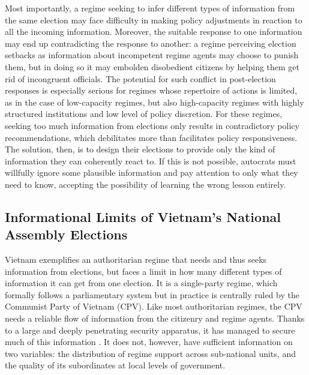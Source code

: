 \documentclass[12pt]{article}
\newcommand{\1}{\mathbbm{1}}
\begin{document}
Most importantly, a regime seeking to infer different types of information from the same election may face difficulty in making policy adjustments in reaction to all the incoming information. Moreover, the suitable response to one information may end up contradicting the response to another: a regime perceiving election setbacks as information about incompetent regime agents may choose to punish them, but in doing so it may embolden disobedient citizens by helping them get rid of incongruent officials. The potential for such conflict in post-election responses is especially serious for regimes whose repertoire of actions is limited, as in the case of low-capacity regimes, but also high-capacity regimes with highly structured institutions and low level of policy discretion. For these regimes, seeking too much information from elections only results in contradictory policy recommendations, which debilitates more than facilitates policy responsiveness. The solution, then, is to design their elections to provide only the kind of information they can coherently react to. If this is not possible, autocrats must willfully ignore some plausible information and pay attention to only what they need to know, accepting the possibility of learning the wrong lesson entirely. 

\subsection{Informational Limits of Vietnam's National Assembly Elections}
\label{sec:vietnam_limits}
Vietnam exemplifies an authoritarian regime that needs and thus seeks information from elections, but faces a limit in how many different types of information it can get from one election. It is a single-party regime, which formally follows a parliamentary system but in practice is centrally ruled by the Communist Party of Vietnam (CPV). Like most authoritarian regimes, the CPV needs a reliable flow of information from the citizenry and regime agents. Thanks to a large and deeply penetrating security apparatus, it has managed to secure much of this information \citep[see][]{Thayer2014}. It does not, however, have sufficient information on two variables: the distribution of regime support across sub-national units, and the quality of its subordinates at local levels of government. 
\end{document}
